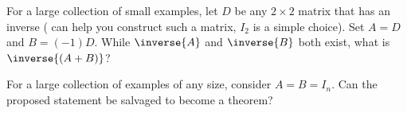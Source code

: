 For a large collection of small examples, let $D$ be any $2\times 2$ matrix that has an inverse ( can help you construct such a matrix, $I_2$ is a simple choice).  Set $A=D$ and $B=(-1)D$.  While $\inverse{A}$ and $\inverse{B}$ both exist, what is $\inverse{\left(A+B\right)}$?\par
%
For a large collection of examples of any size, consider $A=B=I_n$.  Can the proposed statement be salvaged to become a theorem?